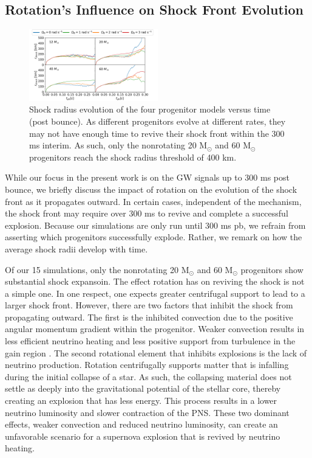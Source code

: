 \documentclass[twocolumn,times]{aastex62}  %
\newcommand{\Msun}{\ensuremath{\mathrm{M}_\odot}\xspace}
\begin{document}
\subsection{Rotation's Influence on Shock Front Evolution}

\begin{figure}[t]
    \centering
    \includegraphics[width = 0.5\textwidth]{figures/M1_shock_mass.pdf}
    \caption{Shock radius evolution of the four progenitor models versus time (post bounce).  As different progenitors evolve at different rates, they may not have enough time to revive their shock front within the 300 ms interim.  As such, only the nonrotating 20 \Msun and 60 \Msun progenitors reach the shock radius threshold of 400 km. }
    \label{fig:shock}
\end{figure} 

While our focus in the present work is on the GW signals up to 300 ms post bounce, we briefly discuss the impact of rotation on the evolution of the shock front as it propagates outward.  In certain cases, independent of the mechanism, the shock front may require over 300 ms to revive and complete a successful explosion.  Because our simulations are only run until 300 ms pb, we refrain from asserting which progenitors successfully explode.  Rather, we remark on how the average shock radii develop with time.

Of our 15 simulations, only the nonrotating 20 \Msun and 60 \Msun progenitors show substantial shock expansoin.  The effect rotation has on reviving the shock is not a simple one. 
In one respect, one expects greater centrifugal support to lead to a larger shock front.  However, there are two factors that inhibit the shock from propagating outward.  The first is the inhibited convection due to the positive angular momentum gradient within the progenitor. Weaker convection results in less efficient neutrino heating \citep{dolence:2013, murphy:2013} and less positive support from turbulence in the gain region \citep{couch:2015a, mabanta:2018}.  The  second rotational element that inhibits explosions is the lack of neutrino production.  Rotation centrifugally supports matter that is infalling during the initial collapse of a star.  As such, the collapsing material does not settle as deeply into the gravitational potential of the stellar core, thereby creating an explosion that has less energy.  This process results in a lower neutrino luminosity and slower contraction of the PNS. 
These two dominant effects, weaker convection and reduced neutrino luminosity, can create an unfavorable scenario for a supernova explosion that is revived by neutrino heating.
\end{document}

